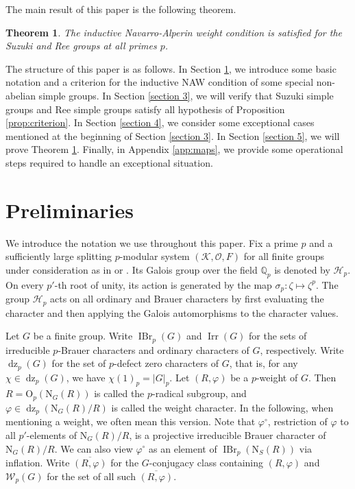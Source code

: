 \documentclass[11pt,a4paper]{article}
\numberwithin{equation}{section}
\newtheorem{theorem}{Theorem}[section]
\theoremstyle{definition}
\theoremstyle{remark}
\newcommand{\Irr}{\operatorname{Irr}}
\newcommand{\IBr}{\operatorname{IBr}}
\newcommand{\dz}{\operatorname{dz}}
\newcommand{\OO}{\mathrm{O}}
\newcommand{\HH}{\mathcal H}
\newcommand{\WW}{\mathcal W}
\newcommand{\QQ}{\mathbb Q}
\newcommand{\NN}{\mathrm N}
\newcommand{\mcite}[2]{\cite[#2]{#1}}
\begin{document}
The main result of this paper is the following theorem.
\begin{theorem}\label{thm:main}
The inductive Navarro-Alperin weight condition is satisfied for  the Suzuki and Ree groups at all primes $p$.
\end{theorem}

The structure of this paper is as follows. 
In Section \ref{section 2}, we introduce some basic notation and a criterion for the inductive NAW condition of some special non-abelian simple groups. In Section \ref{section 3}, we will verify that Suzuki simple groups and Ree simple groups satisfy all hypothesis of Proposition \ref{prop:criterion}. In Section \ref{section 4}, we consider some exceptional cases mentioned at the beginning of Section \ref{section 3}. In Section \ref{section 5}, we will prove Theorem \ref{thm:main}. Finally, in Appendix \ref{app:maps}, we provide some operational steps required to handle an exceptional situation.


\section{Preliminaries}\label{section 2}
We introduce the notation we use throughout this paper. Fix a prime $p$ and a sufficiently large splitting $p$-modular system $(\mathcal K,\mathcal O,F)$ for all finite groups under consideration as in \mcite{FFZ}{Section 1} or \cite[Section 2]{T2013}. Its Galois group over the field \(\QQ_p\) is denoted by \(\HH_p\). On every $p'$-th root of unity, its action is generated by the map \(\sigma_p:\zeta\mapsto\zeta^p\).
The group $\HH_p$ acts on all ordinary and Brauer characters by first evaluating the character and then applying the Galois automorphisms to the character values.

Let $G$ be a finite group. Write $\IBr_p(G)$ and $\Irr(G)$ for the sets of irreducible $p$-Brauer characters and ordinary characters of $G$, respectively. Write $\dz_p(G)$ for the set of $p$-defect zero characters of $G$, that is, for any $\chi\in\dz_p(G)$, we have $\chi(1)_p=|G|_p$.  Let $(R,\varphi)$ be a $p$-weight of $G$. Then $R=\OO_p (\NN_G(R))$ is called the $p$-radical subgroup, and $\varphi \in \dz_p(\NN_G(R)/R)$ is called the weight character. In the following, when mentioning a weight, we often mean this version.  Note that $\varphi^\circ$, restriction of $\varphi$ to all $p'$-elements of $\NN_G(R)/R$, is a projective irreducible Brauer character of $\NN_G(R)/R$. We  can also view $\varphi^\circ$ as an element of $\IBr_p(\NN_S(R))$ via inflation.
Write $\overline{(R,\varphi)}$ for the $G$-conjugacy class containing $(R,\varphi)$ and $\WW_p(G)$ for the set of all such $\overline{(R,\varphi)}$.  
\end{document}
